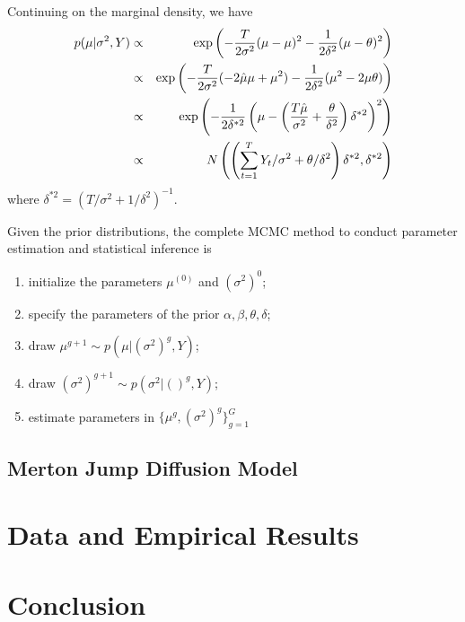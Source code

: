 \documentclass[11pt,reqno,final]{amsart}
\def\exp{\hbox{\rm exp}}
\begin{document}
Continuing on the marginal density, we have
\begin{eqnarray*}
p(\mu|\sigma^2, Y) &\propto& \exp\left(-\frac{T}{2\sigma^2}(\mu-\mu)^2-\frac{1}{2\delta^2}(\mu-\theta)^2\right) \\
                   &\propto& \exp\left(-\frac{T}{2\sigma^2}(-2\hat{\mu}\mu+\mu^2)-\frac{1}{2\delta^2}(\mu^2-2\mu\theta)\right) \\
                   &\propto& \exp\left(-\frac{1}{2\delta^{*2}} \left( \mu-\left(\frac{T\hat{\mu}}{\sigma^2} + \frac{\theta}{\delta^2}\right)\delta^{*2} \right)^2 \right) \\
                   &\propto& N\left( \left( \sum_{t=1}^T Y_t / \sigma^2 + \theta/\delta^2 \right)\delta^{*2}, \delta^{*2} \right)
\end{eqnarray*}
where $\delta^{*2} = (T/\sigma^2+1/\delta^2)^{-1}$.

Given the prior distributions, the complete MCMC method to conduct parameter estimation and statistical inference is
\begin{enumerate}
    \item initialize the parameters $\mu^{(0)}$ and $(\sigma^2)^{0}$;
    \item specify the parameters of the prior $\alpha, \beta, \theta, \delta$;
    \item draw $\mu^{g+1} \sim p(\mu|(\sigma^2)^{g}, Y)$;
    \item draw $(\sigma^2)^{g+1} \sim p(\sigma^2|()^{g}, Y)$;
    \item estimate parameters in $\{\mu^{g}, (\sigma^2)^{g} \}_{g=1}^{G}$ 
\end{enumerate}


\subsection{Merton Jump Diffusion Model}

\section{Data and Empirical Results}

\section{Conclusion}



%
%
\newpage


%
%
%
\end{document}
